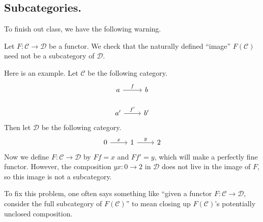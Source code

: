 \documentclass[../notes.tex]{subfiles}
\begin{document}
\subsection{Subcategories.}
To finish out class, we have the following warning.
\begin{warn}
	Let $F:\mathcal C\to\mathcal D$ be a functor. We check that the naturally defined ``image'' $F(\mathcal C)$ need not be a subcategory of $\mathcal D$.
\end{warn}
Here is an example. Let $\mathcal C$ be the following category.
\[\begin{tikzcd}
	a & b \\
	{a'} & {b'}
	\arrow["f", from=1-1, to=1-2]
	\arrow["{f'}", from=2-1, to=2-2]
\end{tikzcd}\]
Then let $\mathcal D$ be the following category.
\[\begin{tikzcd}
	0 & 1 & 2
	\arrow["x", from=1-1, to=1-2]
	\arrow["y", from=1-2, to=1-3]
\end{tikzcd}\]
Now we define $F:\mathcal C\to\mathcal D$ by $Ff=x$ and $Ff'=y$, which will make a perfectly fine functor. However, the composition $yx:0\to2$ in $\mathcal D$ does not live in the image of $F$, so this image is not a subcategory.

To fix this problem, one often says something like ``given a functor $F:\mathcal C\to\mathcal D$, consider the full subcategory of $F(\mathcal C)$'' to mean closing up $F(\mathcal C)$'s potentially unclosed composition.
\end{document}
